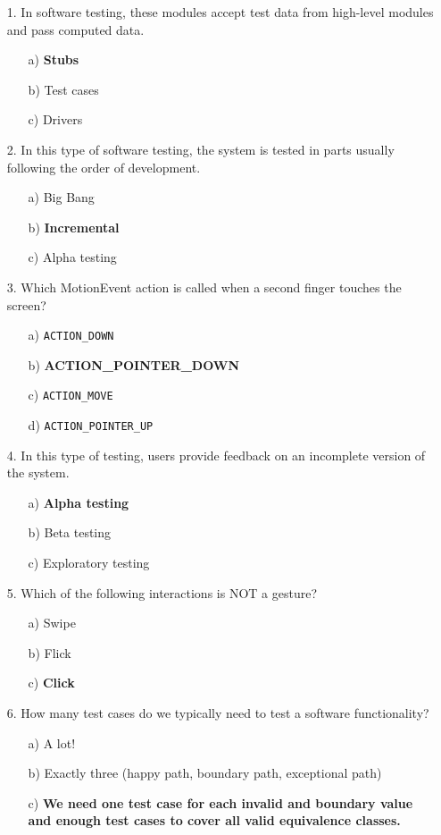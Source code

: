 \documentclass[12pt]{book}
\begin{document}
\begin{itemize}
    \item[1.] In software testing, these modules accept test data from high-level modules and pass computed data.
    \begin{itemize}
        \item[a)] \textbf{Stubs}
        \item[b)] Test cases
        \item[c)] Drivers
    \end{itemize}

    \item[2.] In this type of software testing, the system is tested in parts usually following the order of development.
    \begin{itemize}
        \item[a)] Big Bang
        \item[b)] \textbf{Incremental}
        \item[c)] Alpha testing
    \end{itemize}

    \item[3.] Which MotionEvent action is called when a second finger touches the screen?
    \begin{itemize}
        \item[a)] \texttt{ACTION\_DOWN}
        \item[b)] \textbf{ACTION\_POINTER\_DOWN}
        \item[c)] \texttt{ACTION\_MOVE}
        \item[d)] \texttt{ACTION\_POINTER\_UP}
    \end{itemize}

    \item[4.] In this type of testing, users provide feedback on an incomplete version of the system.
    \begin{itemize}
        \item[a)] \textbf{Alpha testing}
        \item[b)] Beta testing
        \item[c)] Exploratory testing
    \end{itemize}

    \item[5.] Which of the following interactions is NOT a gesture?
    \begin{itemize}
        \item[a)] Swipe
        \item[b)] Flick
        \item[c)] \textbf{Click}
    \end{itemize}
\newpage
    \item[6.] How many test cases do we typically need to test a software functionality?
    \begin{itemize}
        \item[a)] A lot!
        \item[b)] Exactly three (happy path, boundary path, exceptional path)
        \item[c)] \textbf{We need one test case for each invalid and boundary value and enough test cases to cover all valid equivalence classes.}
    \end{itemize}


\end{itemize}
\end{document}
